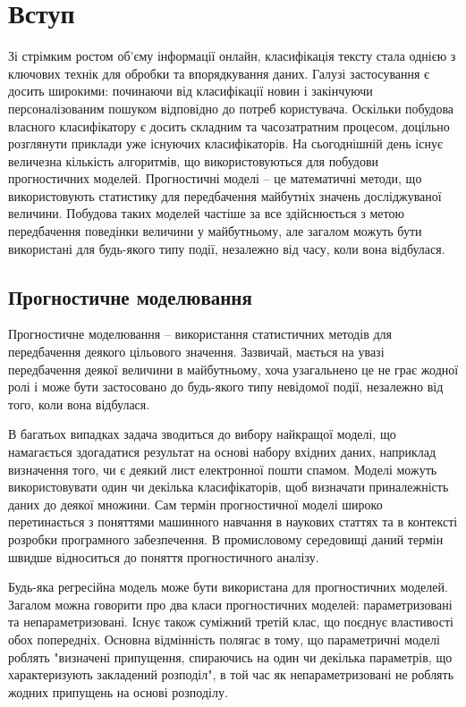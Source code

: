 \section{Вступ}
Зі стрімким ростом об'єму інформації онлайн, класифікація тексту стала однією з ключових
технік для обробки та впорядкування даних. Галузі застосування є досить широкими:
починаючи від класифікації новин і закінчуючи персоналізованим пошуком відповідно до
потреб користувача. Оскільки побудова власного класифікатору є досить складним та
часозатратним процесом, доцільно розглянути приклади уже існуючих класифікаторів.
На сьогоднішній день існує величезна кількість алгоритмів, що використовуються для побудови прогностичних моделей. Прогностичні моделі – це математичні методи, що використовують статистику для передбачення майбутніх значень досліджуваної величини. Побудова таких моделей частіше за все здійснюється з метою передбачення поведінки величини у майбутньому, але загалом можуть бути використані для будь-якого типу події, незалежно від часу, коли вона відбулася.


\subsection{Прогностичне моделювання}
Прогностичне моделювання – використання статистичних методів для передбачення деякого цільового значення. Зазвичай, мається на увазі передбачення деякої величини в майбутньому, хоча узагальнено це не грає жодної ролі і може бути застосовано до будь-якого типу невідомої події, незалежно від того, коли вона відбулася.

В багатьох випадках задача зводиться до вибору найкращої моделі, що намагається здогадатися результат на основі набору вхідних даних, наприклад визначення того, чи є деякий лист електронної пошти спамом. Моделі можуть використовувати один чи декілька класифікаторів, щоб визначати приналежність даних до деякої множини. Сам термін прогностичної моделі широко перетинається з поняттями машинного навчання в наукових статтях та в контексті розробки програмного забезпечення. В промисловому середовищі даний термін швидше відноситься до поняття прогностичного аналізу.

Будь-яка регресійна модель може бути використана для прогностичних моделей. Загалом можна говорити про два класи прогностичних моделей: параметризовані та непараметризовані. Існує також суміжний третій клас, що поєднує властивості обох попередніх. Основна відмінність полягає в тому, що параметричні моделі роблять "визначені припущення, спираючись на один чи декілька параметрів, що характеризують закладений розподіл", в той час як непараметризовані не роблять жодних припущень на основі розподілу.

